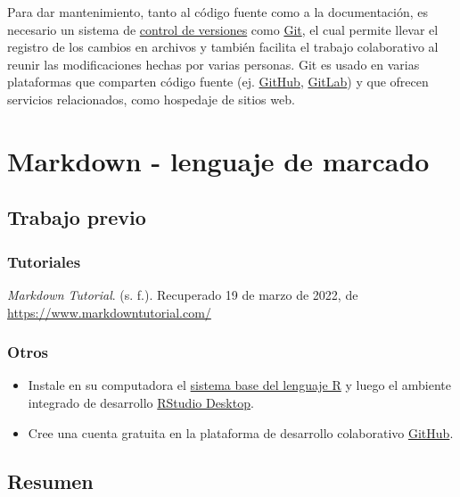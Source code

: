 \documentclass[
  letterpaper,
  DIV=11,
  numbers=noendperiod]{scrreprt}
\providecommand{\tightlist}{%
  \setlength{\itemsep}{0pt}\setlength{\parskip}{0pt}}\usepackage{longtable,booktabs,array}
\begin{document}
Para dar mantenimiento, tanto al código fuente como a la documentación,
es necesario un sistema de
\href{https://es.wikipedia.org/wiki/Control_de_versiones}{control de
versiones} como \href{https://es.wikipedia.org/wiki/Git}{Git}, el cual
permite llevar el registro de los cambios en archivos y también facilita
el trabajo colaborativo al reunir las modificaciones hechas por varias
personas. Git es usado en varias plataformas que comparten código fuente
(ej. \href{https://github.com/}{GitHub},
\href{https://about.gitlab.com/}{GitLab}) y que ofrecen servicios
relacionados, como hospedaje de sitios web.

\hypertarget{markdown---lenguaje-de-marcado}{%
\chapter{Markdown - lenguaje de
marcado}\label{markdown---lenguaje-de-marcado}}

\hypertarget{trabajo-previo-1}{%
\section{Trabajo previo}\label{trabajo-previo-1}}

\hypertarget{tutoriales}{%
\subsection{Tutoriales}\label{tutoriales}}

\emph{Markdown Tutorial}. (s. f.). Recuperado 19 de marzo de 2022, de
\url{https://www.markdowntutorial.com/}

\hypertarget{otros}{%
\subsection{Otros}\label{otros}}

\begin{itemize}
\tightlist
\item
  Instale en su computadora el
  \href{https://cloud.r-project.org/}{sistema base del lenguaje R} y
  luego el ambiente integrado de desarrollo
  \href{https://www.rstudio.com/products/rstudio/download/\#download}{RStudio
  Desktop}.
\item
  Cree una cuenta gratuita en la plataforma de desarrollo colaborativo
  \href{https://github.com/}{GitHub}.
\end{itemize}

\hypertarget{resumen}{%
\section{Resumen}\label{resumen}}
\end{document}
